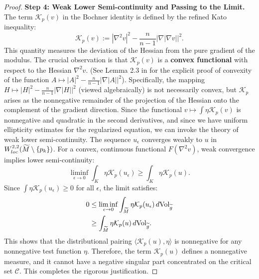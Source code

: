 \begin{proof}
\textbf{Step 4: Weak Lower Semi-continuity and Passing to the Limit.}
The term $\mathcal{K}_p(v)$ in the Bochner identity is defined by the refined Kato inequality:
\[ \mathcal{K}_p(v) := |\nabla^2 v|^2 - \frac{n}{n-1} \big| \nabla |\nabla v| \big|^2. \]
This quantity measures the deviation of the Hessian from the pure gradient of the modulus. The crucial observation is that $\mathcal{K}_p(v)$ is a \textbf{convex functional} with respect to the Hessian $\nabla^2 v$. (See Lemma 2.3 in \cite{amo2024} for the explicit proof of convexity of the function $A \mapsto |A|^2 - \frac{n}{n-1}|\nabla |A||^2$).
Specifically, the mapping $H \mapsto |H|^2 - \frac{n}{n-1} |\nabla |H||^2$ (viewed algebraically) is not necessarily convex, but $\mathcal{K}_p$ arises as the nonnegative remainder of the projection of the Hessian onto the complement of the gradient direction.
Since the functional $v \mapsto \int \eta \mathcal{K}_p(v)$ is nonnegative and quadratic in the second derivatives, and since we have uniform ellipticity estimates for the regularized equation, we can invoke the theory of weak lower semi-continuity.
The sequence $u_\epsilon$ converges weakly to $u$ in $W^{2,2}_{loc}(\widetilde{M} \setminus \{p_k\})$.
For a convex, continuous functional $F(\nabla^2 v)$, weak convergence implies lower semi-continuity:
\[ \liminf_{\epsilon \to 0} \int_K \eta \mathcal{K}_p(u_\epsilon) \ge \int_K \eta \mathcal{K}_p(u). \]
Since $\int \eta \mathcal{K}_p(u_\epsilon) \ge 0$ for all $\epsilon$, the limit satisfies:
\begin{align*}
    0 &\le \liminf_{\epsilon \to 0} \int_{\widetilde{M}} \eta \mathcal{K}_p(u_\epsilon) \,d\text{Vol}_{\widetilde{g}} \\
      &\ge \int_{\widetilde{M}} \eta \mathcal{K}_p(u) \,d\text{Vol}_{\widetilde{g}}.
\end{align*}
This shows that the distributional pairing $\langle \mathcal{K}_p(u), \eta \rangle$ is nonnegative for any nonnegative test function $\eta$. Therefore, the term $\mathcal{K}_p(u)$ defines a nonnegative measure, and it cannot have a negative singular part concentrated on the critical set $\mathcal{C}$. This completes the rigorous justification.
\end{proof}
